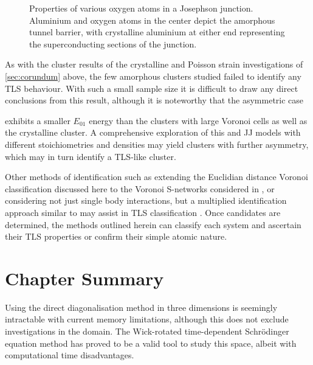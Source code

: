 \begin{figure}[htp]
\tlsjjmargins
\begin{adjustwidth}{\tlsjjleft}{\tlsjjright}
\resizebox{\widefigure}{!}{}
  \caption[Oxygen Properties in a Josephson Junction]{\label{fig:tlsinjj}Properties of various oxygen atoms in a Josephson junction. Aluminium  and oxygen  atoms in the center depict the amorphous tunnel barrier, with crystalline aluminium at either end representing the superconducting sections of the junction.}
\end{adjustwidth}
\end{figure}

As with the cluster results of the crystalline and Poisson strain investigations of \cref{sec:corundum} above, the few amorphous clusters studied failed to identify any TLS behaviour.
With such a small sample size it is difficult to draw any direct conclusions from this result, although it is noteworthy that the asymmetric case  exhibits a smaller $E_{01}$ energy than the clusters with large Voronoi cells as well as the crystalline cluster.
A comprehensive exploration of this and JJ models with different stoichiometries and densities may yield clusters with further asymmetry, which may in turn identify a TLS-like cluster.

Other methods of identification such as extending the Euclidian distance Voronoi classification discussed here to the Voronoi S-networks considered in , or considering not just single body interactions, but a multiplied identification approach similar to \citeauthor{Paz2014} may assist in TLS classification \cite{Paz2014}.
Once candidates are determined, the methods outlined herein can classify each system and ascertain their TLS properties or confirm their simple atomic nature.

\section{Chapter Summary}\label{sec:summary3d}

Using the direct diagonalisation method in three dimensions is seemingly intractable with current memory limitations, although this does not exclude investigations in the  domain.
The Wick-rotated time-dependent Schrödinger equation method has proved to be a valid tool to study this space, albeit with computational time disadvantages.

